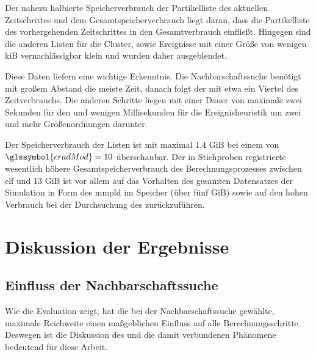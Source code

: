 Der nahezu halbierte Speicherverbrauch der Partikelliste des aktuellen Zeitschrittes und dem Gesamtspeicherverbrauch liegt daran, dass die Partikelliste des vorhergehenden Zeitschrittes in den Gesamtverbrauch einfließt. Hingegen sind die anderen Listen für die Cluster,  sowie Ereignisse mit einer Größe von wenigen \gls{kiB} vernachlässigbar klein und wurden daher ausgeblendet.

Diese Daten liefern eine wichtige Erkenntnis. Die Nachbarschaftssuche benötigt mit großem Abstand die meiste Zeit, danach folgt der \CFD mit etwa ein Viertel des Zeitverbrauchs. Die anderen Schritte liegen mit einer Dauer von maximale zwei Sekunden für den \SECC und wenigen Millisekunden für die Ereignisheuristik um zwei und mehr Größenordnungen darunter.

Der Speicherverbrauch der Listen ist mit maximal 1,4 \gls{GiB} bei einem  von $\glssymbol{cradMod} = 10$ überschaubar. Der in Stichproben registrierte wesentlich höhere Gesamtspeicherverbrauch des Berechnungsprozesses zwischen elf und 13 \gls{GiB} ist vor allem auf das Vorhalten des gesamten Datensatzes der Simulation in Form des \gls{mmpld} im Speicher (über fünf \gls{GiB}) sowie auf den hohen Verbrauch bei der Durchsuchung des  zurückzuführen.


\chapter{Diskussion der Ergebnisse}\label{sec:diskussion}

\section{Einfluss der Nachbarschaftssuche}\label{sec:eva:nachbarschaftssuche}

Wie die Evaluation zeigt, hat die bei der Nachbarschaftssuche gewählte, maximale Reichweite einen maßgeblichen Einfluss auf alle Berechnungsschritte. Deswegen ist die Diskussion des   und die damit verbundenen Phänomene bedeutend für diese Arbeit.

